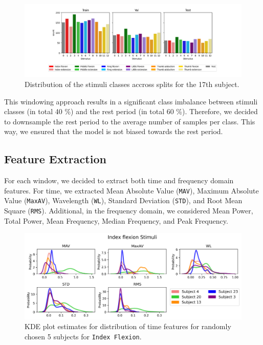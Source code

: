 \documentclass[10pt]{article}
\begin{document}
\begin{figure}[h]
    \centering
    \includegraphics[width=1\textwidth]{../figures/downsampling.pdf}
    \caption{Distribution of the stimuli classes accross splits for the 17th subject.}
    \label{fig:downsampling}
\end{figure}

This windowing approach results in a significant class imbalance between stimuli classes (in total 40 \%) and the rest period (in total 60 \%).
Therefore, we decided to downsample the rest period to the average number of samples per class. This way, we ensured that the model is not biased towards the rest period.

\subsection{Feature Extraction}
For each window, we decided to extract both time and frequency domain features. For time, we extracted 
Mean Absolute Value (\texttt{MAV}), Maximum Absolute Value (\texttt{MaxAV}), Wavelength (\texttt{WL}), Standard Deviation (\texttt{STD}), and Root Mean Square (\texttt{RMS}). 
Additional, in the frequency domain, we considered Mean Power, Total Power, Mean Frequency, Median Frequency, and Peak Frequency. 

\begin{figure}[h]
    \centering
    \includegraphics[width=1\textwidth]{../figures/features/time/kde/Index flexion.png}
    \caption{KDE plot estimates for distribution of time features for randomly chosen 5 subjects for \texttt{Index Flexion}.}
    \label{fig:featext}
\end{figure}
\end{document}
